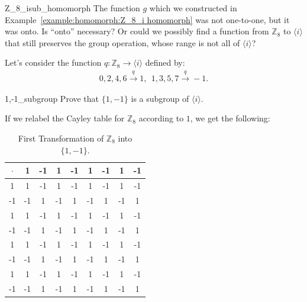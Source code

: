 \begin{example}{Z_8_isub_homomorph}
The function $g$ which we constructed in Example~\ref{example:homomorph:Z_8_i homomorph} was not one-to-one, but it was onto. Is ``onto'' necessary? Or could we possibly find a function from ${\mathbb Z}_8$ to $\langle i \rangle$ that still preserves the group operation, whose range is not all of $\langle i \rangle$?  


Let's consider the function $q: {\mathbb Z}_8 \longrightarrow \langle i \rangle$  defined by: 
\begin{align*}
    0,2,4,6\overset{q}{\longrightarrow} 1 ,~~     1,3,5,7 \overset{q}{\longrightarrow} -1.
\end{align*}

\begin{exercise}{1,-1_subgroup}
Prove that $\{1,-1\}$ is a subgroup of $\langle i \rangle$.
\end{exercise}

If we relabel the Cayley table for ${\mathbb Z}_8$ according to $1$, we get the following:

\begin{table}[H]
\caption{\label{1,-1_Z8_transfom1}First Transformation of ${\mathbb Z}_8$ into $\{1,-1\}$.}{\small
\begin{center}
\begin{tabular}{c|cccccccc}
$\cdot$ & 1 &-1 & 1 & -1 & 1 & -1 & 1 & -1 \\
\hline
1         & 1 &-1 & 1 & -1 & 1 & -1 & 1 & -1 \\
-1      &-1 & 1 & -1 & 1 & -1 & 1 & -1 & 1  \\
1       & 1 &-1 & 1 & -1 & 1 & -1 & 1 & -1 \\
-1       &-1 & 1 & -1 & 1 & -1 & 1 & -1 & 1  \\
1        & 1 &-1 & 1 & -1 & 1 & -1 & 1 & -1 \\
-1        &-1 & 1 & -1 & 1 & -1 & 1 & -1 & 1  \\
1      & 1 &-1 & 1 & -1 & 1 & -1 & 1 & -1 \\
-1      &-1 & 1 & -1 & 1 & -1 & 1 & -1 & 1  \\
\end{tabular}
\end{center}
}
\end{table}


\end{example}

